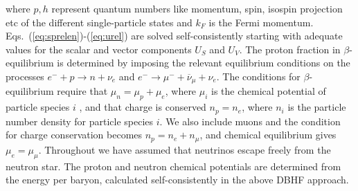 where $p,h$ represent quantum numbers like momentum, spin, isospin projection
etc of the different single-particle states and $k_F$ is the Fermi
momentum. 
Eqs.\ (\ref{eq:sprelen})-(\ref{eq:urel}) are solved self-consistently
starting
with adequate values for the scalar and vector components
$U_S$ and $U_V$.
The proton fraction in $\beta$-equilibrium is
determined by imposing the relevant equilibrium conditions on the processes
$e^{-}+p \rightarrow n+\nu_{e}$
and $e^{-}\rightarrow \mu^{-}+\overline{\nu}_{\mu}+\nu_{e}$.
The conditions for $\beta$-equilibrium require that 
$\mu_{n}=\mu_{p}+\mu_{e}$,
where $\mu_{i}$ is the chemical potential of particle species $i$ ,
and that 
charge is conserved 
$n_{p}=n_{e}$,
where $n_{i}$ is the particle number density for 
particle species $i$.  We also include muons and the condition for charge 
conservation becomes 
$n_{p}=n_{e}+n_{\mu}$,
and chemical equilibrium gives
$\mu_{e}=\mu_{\mu}$.
Throughout we have assumed that neutrinos escape freely from the neutron  
star.  The proton and neutron chemical potentials are determined from 
the energy per baryon, calculated self-consistently in the above DBHF 
approach.
 

